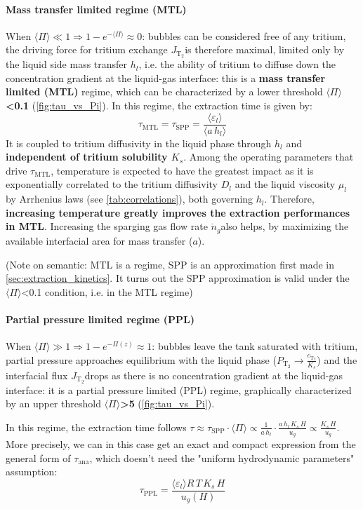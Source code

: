 \documentclass[a4paper,11pt,oneside]{report}
\newcommand{\PT}{\ensuremath{P_\mathrm{T_2}}}
\newcommand{\CT}{\ensuremath{c_\mathrm{T_2}}}
\newcommand{\JT}{\ensuremath{J_\mathrm{T_2}}}
\newcommand{\Tana}{\ensuremath{\tau_\mathrm{ana}}}
\newcommand{\PI}{\ensuremath{\langle \Pi \rangle}}
\newcommand{\ndotg}{\ensuremath{\dot n_g}}
\newcounter{assumption}[chapter]
\begin{document}
\paragraph{Mass transfer limited regime (MTL)}
When $\PI\ll1 \Rightarrow 1-e^{-\PI}\approx0$: bubbles can be considered free of any tritium, the driving force for tritium exchange \JT is therefore maximal, limited only by the liquid side mass transfer $h_l$, i.e. the ability of tritium to diffuse down the concentration gradient at the liquid-gas interface: this is a \textbf{mass transfer limited (MTL)} regime, which can be characterized by a lower threshold \textbf{\PI<0.1} (\cref{fig:tau_vs_Pi}). In this regime, the extraction time is given by:
\begin{equation}
    \label{eq:tau_MTL} \boxed{\tau_\mathrm{MTL}=\tau_\mathrm{SPP}=\frac{\langle\varepsilon_l\rangle}{\langle a \, h_l\rangle}}
\end{equation}
It is coupled to tritium diffusivity in the liquid phase through $h_l$ and \textbf{independent of tritium solubility $K_s$}. Among the operating parameters that drive $\tau_\mathrm{MTL}$, temperature is expected to have the greatest impact as it is exponentially correlated to the tritium diffusivity $D_l$ and the liquid viscosity $\mu_l$ by Arrhenius laws (see \cref{tab:correlations}), both governing $h_l$. Therefore, \textbf{increasing temperature greatly improves the extraction performances in MTL}. Increasing the sparging gas flow rate \ndotg also helps, by maximizing the available interfacial area for mass transfer ($a$). 

(Note on semantic: MTL is a regime, SPP is an approximation first made in \cref{sec:extraction_kinetics}. It turns out the SPP approximation is valid under the \PI<0.1 condition, i.e. in the MTL regime)

\paragraph{Partial pressure limited regime (PPL)}
When $\PI\gg1 \Rightarrow1-e^{-\Pi(z)}\approx1$: bubbles leave the tank saturated with tritium, partial pressure approaches equilibrium with the liquid phase ($\PT \rightarrow \frac{\CT}{K_s}$) and the interfacial flux \JT drops as there is no concentration gradient at the liquid-gas interface: it is a partial pressure limited (PPL) regime, graphically characterized by an upper threshold \textbf{\PI>5} (\cref{fig:tau_vs_Pi}).

In this regime, the extraction time follows $\tau\approx \tau_\mathrm{SPP}\cdot\PI \propto \frac{1}{a\,h_l}\cdot \frac{a\,h_l\,K_s\,H}{u_g}\propto \frac{K_s\,H}{u_g}$. More precisely, we can in this case get an exact and compact expression from the general form of \Tana, which doesn't need the "uniform hydrodynamic parameters" assumption: 
\begin{equation}
    \label{eq:tau_PPL}
    \boxed{\tau_\mathrm{PPL}=\frac{\langle\varepsilon_l\rangle R\,T\,K_s\,H}{u_g(H)}}
\end{equation}
\end{document}
